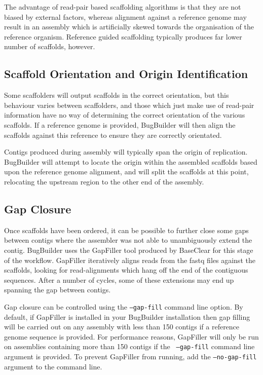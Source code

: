 \documentclass[a4paper,10pt]{article}
\begin{document}
The advantage of read-pair based scaffolding algorithms is that they are not
biased by external factors, whereas alignment against a reference genome may
result in an assembly which is artificially skewed towards the organisation of
the reference organism. Reference guided scaffolding typically produces far
lower number of scaffolds, however.

\subsection{Scaffold Orientation and Origin Identification}

Some scaffolders will output scaffolds in the correct orientation, but this
behaviour varies between scaffolders, and those which just make use of
read-pair information have no way of determining the correct orientation of the
various scaffolds. If a reference genome is provided, BugBuilder will then
align the scaffolds against this reference to ensure they are correctly
orientated. 

Contigs produced during assembly will typically span the origin of replication.
BugBuilder will attempt to locate the origin within the assembled scaffolds
based upon the reference genome alignment, and will split the scaffolds at this
point, relocating the upstream region to the other end of the assembly.

\subsection{Gap Closure}

Once scaffolds have been ordered, it can be possible to further close some gaps
between contigs where the assembler was not able to unambiguously extend the
contig. BugBuilder uses the GapFiller tool produced by BaseClear for this stage
of the workflow. GapFiller iteratively aligns reads from the fastq files
against the scaffolds, looking for read-alignments which hang off the end of
the contiguous sequences. After a number of cycles, some of these extensions
may end up spanning the gap between contigs.

Gap closure can be controlled using the {\tt --gap-fill} command line option.
By default, if GapFiller is installed in your BugBuilder installation then gap
filling will be carried out on any assembly with less than 150 contigs if a
reference genome sequence is provided. For performance reasons, GapFiller will
only be run on assemblies containing more than 150 contigs if the {\tt
--gap-fill} command line argument is provided. To prevent GapFiller from
running, add the {\tt --no-gap-fill} argument to the command line.
\end{document}
